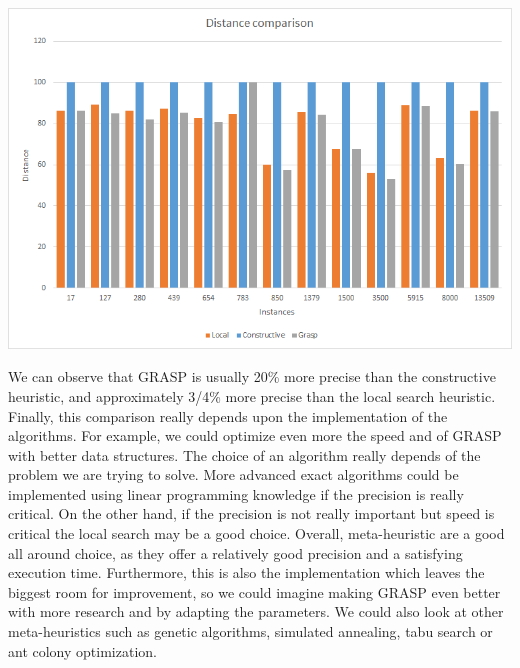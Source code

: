 \documentclass[a4paper, 12pt]{report}
\begin{document}
	\begin{center}
		\includegraphics[width=450pt]{DistanceComparison.png}
	\end{center}
	We can observe that GRASP is usually 20\% more precise than the constructive heuristic, and approximately 3/4\% more precise than the local search heuristic.
	\BlankLine
	Finally, this comparison really depends upon the implementation of the algorithms. For example, we could optimize even more the speed and of GRASP with better data structures. The choice of an algorithm really depends of the problem we are trying to solve. More advanced exact algorithms could be implemented using linear programming knowledge if the precision is really critical. On the other hand, if the precision is not really important but speed is critical the local search may be a good choice.
	Overall, meta-heuristic are a good all around choice, as they offer a relatively good precision and a satisfying execution time. Furthermore, this is also the implementation which leaves the biggest room for improvement, so we could imagine making GRASP even better with more research and by adapting the parameters. We could also look at other meta-heuristics such as genetic algorithms, simulated annealing, tabu search or ant colony optimization. 
\end{document}

